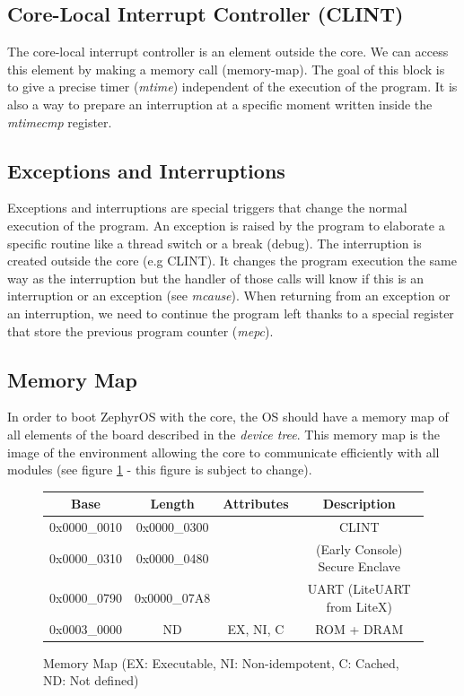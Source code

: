 \documentclass[10pt,letterpaper]{article}
\begin{document}
\subsection{Core-Local Interrupt Controller (CLINT)}

The core-local interrupt controller is an element outside the core. We can access this element by making a memory call (memory-map). The goal of this block is to give a precise timer (\textit{mtime}) independent of the execution of the program. It is also a way to prepare an interruption at a specific moment written inside the \textit{mtimecmp} register.

\subsection{Exceptions and Interruptions}

Exceptions and interruptions are special triggers that change the normal execution of the program. An exception is raised by the program to elaborate a specific routine like a thread switch or a break (debug). The interruption is created outside the core (e.g CLINT). It changes the program execution the same way as the interruption but the handler of those calls will know if this is an interruption or an exception (see \textit{mcause}). When returning from an exception or an interruption, we need to continue the program left thanks to a special register that store the previous program counter (\textit{mepc}).

\subsection{Memory Map}

In order to boot ZephyrOS with the core, the OS should have a memory map of all elements of the board described in the \textit{device tree}. This memory map is the image of the environment allowing the core to communicate efficiently with all modules (see figure \ref{fig:memoryMap} - this figure is subject to change).

\begin{figure}[H]
\begin{center}
 \begin{tabular}{||c c c c||} 
 \hline
 Base & Length & Attributes & Description \\ [0.5ex] 
 \hline\hline
 0x0000\_0010 & 0x0000\_0300 &  & CLINT \\ 
 \hline
 0x0000\_0310 & 0x0000\_0480 & & (Early Console) Secure Enclave \\
\hline
 0x0000\_0790 & 0x0000\_07A8 & & UART (LiteUART from LiteX) \\
\hline
 0x0003\_0000 & ND & EX, NI, C & ROM + DRAM \\
\hline
\end{tabular}
\end{center}
\caption{Memory Map (EX: Executable, NI: Non-idempotent, C: Cached, ND: Not defined)}
\label{fig:memoryMap}
\end{figure}
\end{document}
